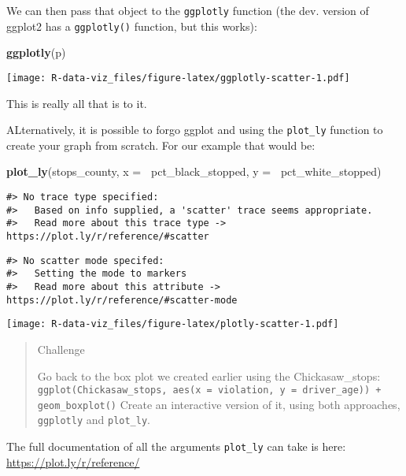 \documentclass[]{book}
\newenvironment{Shaded}{\begin{snugshade}}{\end{snugshade}}
\newcommand{\KeywordTok}[1]{\textcolor[rgb]{0.13,0.29,0.53}{\textbf{#1}}}
\newcommand{\DataTypeTok}[1]{\textcolor[rgb]{0.13,0.29,0.53}{#1}}
\newcommand{\OperatorTok}[1]{\textcolor[rgb]{0.81,0.36,0.00}{\textbf{#1}}}
\newcommand{\NormalTok}[1]{#1}
\theoremstyle{definition}
\theoremstyle{definition}
\theoremstyle{definition}
\theoremstyle{remark}
\begin{document}
We can then pass that object to the \texttt{ggplotly} function (the dev.
version of ggplot2 has a \texttt{ggplotly()} function, but this works):

\begin{Shaded}
\begin{Highlighting}[]
\KeywordTok{ggplotly}\NormalTok{(p) }
\end{Highlighting}
\end{Shaded}

\texttt{[image: R-data-viz\_files/figure-latex/ggplotly-scatter-1.pdf]}

This is really all that is to it.

ALternatively, it is possible to forgo ggplot and using the
\texttt{plot\_ly} function to create your graph from scratch. For our
example that would be:

\begin{Shaded}
\begin{Highlighting}[]
\KeywordTok{plot_ly}\NormalTok{(stops_county, }\DataTypeTok{x =} \OperatorTok{~}\NormalTok{pct_black_stopped, }\DataTypeTok{y =} \OperatorTok{~}\NormalTok{pct_white_stopped)}
\end{Highlighting}
\end{Shaded}

\begin{verbatim}
#> No trace type specified:
#>   Based on info supplied, a 'scatter' trace seems appropriate.
#>   Read more about this trace type -> https://plot.ly/r/reference/#scatter
\end{verbatim}

\begin{verbatim}
#> No scatter mode specifed:
#>   Setting the mode to markers
#>   Read more about this attribute -> https://plot.ly/r/reference/#scatter-mode
\end{verbatim}

\texttt{[image: R-data-viz\_files/figure-latex/plotly-scatter-1.pdf]}

\begin{quote}
Challenge

Go back to the box plot we created earlier using the Chickasaw\_stops:
\texttt{ggplot(Chickasaw\_stops,\ aes(x\ =\ violation,\ y\ =\ driver\_age))\ +}
\texttt{geom\_boxplot()} Create an interactive version of it, using both
approaches, \texttt{ggplotly} and \texttt{plot\_ly}.
\end{quote}

The full documentation of all the arguments \texttt{plot\_ly} can take
is here: \url{https://plot.ly/r/reference/}
\end{document}
